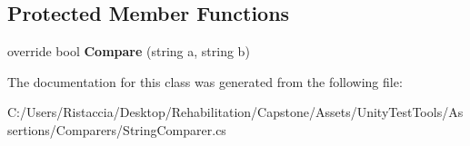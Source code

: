 \subsection*{Protected Member Functions}
\begin{DoxyCompactItemize}
\item 
\mbox{\label{class_unity_test_1_1_string_comparer_a1b8b059fedadc35d80c0fd4e8692d38b}} 
override bool {\bfseries Compare} (string a, string b)
\end{DoxyCompactItemize}


The documentation for this class was generated from the following file\+:\begin{DoxyCompactItemize}
\item 
C\+:/\+Users/\+Ristaccia/\+Desktop/\+Rehabilitation/\+Capstone/\+Assets/\+Unity\+Test\+Tools/\+Assertions/\+Comparers/String\+Comparer.\+cs\end{DoxyCompactItemize}
